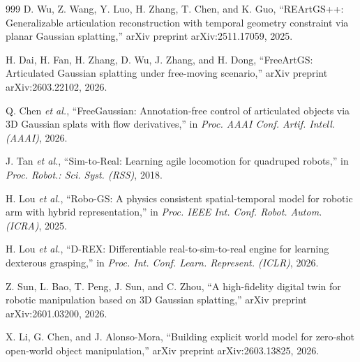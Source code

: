 \documentclass[12pt,a4paper,oneside]{report}
\begin{document}
\begin{thebibliography}{999}
D. Wu, Z. Wang, Y. Luo, H. Zhang, T. Chen, and K. Guo, ``{REArtGS++}: Generalizable articulation reconstruction with temporal geometry constraint via planar Gaussian splatting,'' arXiv preprint arXiv:2511.17059, 2025.




H. Dai, H. Fan, H. Zhang, D. Wu, J. Zhang, and H. Dong, ``{FreeArtGS}: Articulated Gaussian splatting under free-moving scenario,'' arXiv preprint arXiv:2603.22102, 2026.




Q. Chen \textit{et al.}, ``{FreeGaussian}: Annotation-free control of articulated objects via {3D} Gaussian splats with flow derivatives,'' in \textit{Proc. AAAI Conf. Artif. Intell. (AAAI)}, 2026.




J. Tan \textit{et al.}, ``{Sim-to-Real}: Learning agile locomotion for quadruped robots,'' in \textit{Proc. Robot.: Sci. Syst. (RSS)}, 2018.




H. Lou \textit{et al.}, ``{Robo-GS}: A physics consistent spatial-temporal model for robotic arm with hybrid representation,'' in \textit{Proc. IEEE Int. Conf. Robot. Autom. (ICRA)}, 2025.




H. Lou \textit{et al.}, ``D-REX: Differentiable real-to-sim-to-real engine for learning dexterous grasping,'' in \textit{Proc. Int. Conf. Learn. Represent. (ICLR)}, 2026.




Z. Sun, L. Bao, T. Peng, J. Sun, and C. Zhou, ``A high-fidelity digital twin for robotic manipulation based on {3D} Gaussian splatting,'' arXiv preprint arXiv:2601.03200, 2026.




X. Li, G. Chen, and J. Alonso-Mora, ``Building explicit world model for zero-shot open-world object manipulation,'' arXiv preprint arXiv:2603.13825, 2026.





\end{thebibliography}
\end{document}
